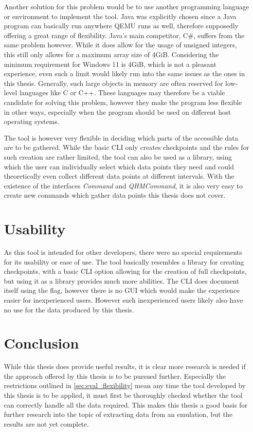Another solution for this problem would be to use another programming language or environment to implement the tool.
Java was explicitly chosen since a Java program can basically run anywhere QEMU runs as well,
therefore supposedly offering a great range of flexibility.
Java's main competitor, C#, suffers from the same problem however.
While it does allow for the usage of unsigned integers,
this still only allows for a maximum array size of 4GiB.
Considering the minimum requirement for Windows 11 is 4GiB,
which is not a pleasant experience,
even such a limit would likely run into the same issues as the ones in this thesis.
Generally, such large objects in memory are often reserved for low-level languages like C or C++.
These languages may therefore be a viable candidate for solving this problem,
however they make the program less flexible in other ways,
especially when the program should be used on different host operating systems.

The tool is however very flexible in deciding which parts of the accessible data are to be gathered.
While the basic CLI only creates checkpoints and the rules for such creation are rather limited,
the tool can also be used as a library, using which the user can individually select which data points they need
and could theoretically even collect different data points at different intervals.
With the existence of the interfaces \emph{Command} and \emph{QHMCommand},
it is also very easy to create new commands which gather data points this thesis does not cover.

\section{Usability}
As this tool is intended for other developers,
there were no special requirements for its usability or ease of use.
The tool basically resembles a library for creating checkpoints,
with a basic CLI option allowing for the creation of full checkpoints,
but using it as a library provides much more abilities.
The CLI does document itself using the  flag,
however there is no GUI which would make the experience easier for inexperienced users.
However such inexperienced users likely also have no use for the data produced by this thesis.

\section{Conclusion}
While this thesis does provide useful results,
it is clear more research is needed if the approach offered by this thesis is to be pursued further.
Especially the restrictions outlined in \autoref{sec:eval_flexibility}
mean any time the tool developed by this thesis is to be applied,
it must first be thoroughly checked whether the tool can correctly handle all the data required.
This makes this thesis a good basis for further research into the topic of extracting data from an emulation,
but the results are not yet complete.